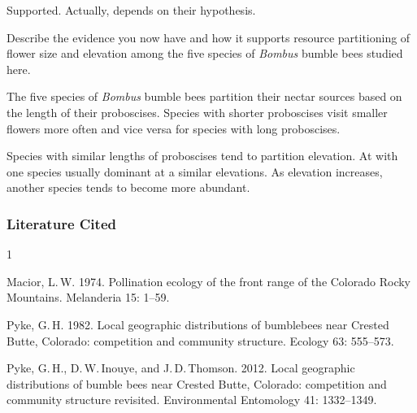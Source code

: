 \documentclass[12pt, hidelinks]{exam}
\newcommand*\AnswerBox[2]{%
    \parbox[t][#1]{0.92\textwidth}{%
    \begin{solution}#2\end{solution}}
    \vspace{\stretch{1}}
}
\newenvironment{AnswerPage}[1]
    {\begin{minipage}[t][#1]{0.92\textwidth}%
    \begin{solution}}
    {\end{solution}\end{minipage}
    \vspace{\stretch{1}}}
\begin{document}
\begin{questions}
\AnswerBox{0.05\textheight}{Supported. Actually, depends on their hypothesis.}

\question[Checkout]
Describe the evidence you now have and how it supports resource partitioning of flower size and elevation among the five species of 
\textit{Bombus} bumble bees studied here.


\begin{AnswerPage}{0.2\textheight}
The five species of \textit{Bombus} bumble bees partition their
nectar sources based on the length of their proboscises. Species
with shorter proboscises visit smaller flowers more often and 
vice versa for species with long proboscises.

Species with similar lengths of proboscises tend to partition
elevation. At with one species usually dominant at a similar 
elevations. As elevation increases, another species tends to become
more abundant.
\end{AnswerPage}


\end{questions}


\subsubsection*{Literature Cited}

\begin{hangparas}{\leftmargin}{1}

Macior, L.\,W. 1974. Pollination ecology of the front
range of the Colorado Rocky Mountains. Melanderia 15: 1–59.

Pyke, G.\,H. 1982. Local geographic distributions of bumblebees 
near Crested Butte, Colorado: competition and community structure.
Ecology 63: 555–573.

Pyke, G.\,H., D.\,W.\,Inouye, and J.\,D.\,Thomson. 2012. Local geographic distributions of bumble bees near Crested Butte, Colorado: competition and community structure revisited. Environmental Entomology 41: 1332–1349.

\end{hangparas}
\end{document}
